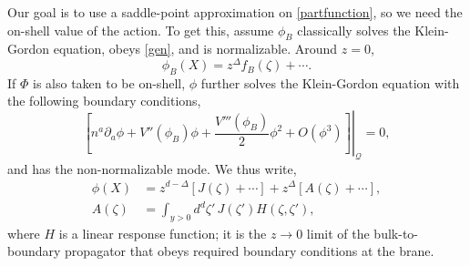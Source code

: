 \documentclass[reprint,amsmath,amssymb,aps,nofootinbib,twocolumn]{revtex4-2}
\begin{document}
Our goal is to use a saddle-point approximation on \eqref{partfunction}, so we need the on-shell value of the action. To get this, assume $\phi_B$ classically solves the Klein-Gordon equation, obeys \eqref{gen}, and is normalizable. Around $z = 0$,
\begin{equation}
\phi_B(X) = z^\Delta f_B(\zeta) + \cdots.\label{modeBack}
\end{equation}
If $\Phi$ is also taken to be on-shell, $\phi$ further solves the Klein-Gordon equation with the following boundary conditions,
\begin{equation}
\left.\left[n^a \partial_a \phi + V''(\phi_B)\phi + \frac{V'''(\phi_B)}{2}\phi^2 + O(\phi^3)\right]\right|_{\mathcal{Q}} = 0,\label{bcFieldA}
\end{equation}
and has the non-normalizable mode. We thus write,
\begin{align}
\phi(X) &= z^{d-\Delta}\left[J(\zeta) + \cdots\right] + z^\Delta \left[A(\zeta) + \cdots\right],\label{fieldAsympt}\\
A(\zeta) &= \int_{y>0} d^d \zeta'\,J(\zeta')H(\zeta,\zeta'),
\end{align}
where $H$ is a linear response function; it is the $ z\rightarrow 0 $ limit of the bulk-to-boundary propagator that obeys required boundary conditions at the brane. %
\end{document}
